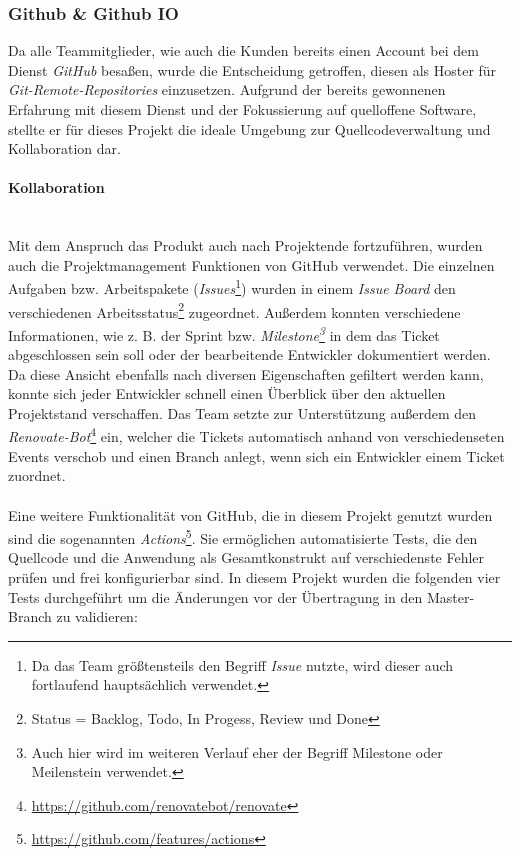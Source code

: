 \documentclass[10pt, a4paper]{article}
\begin{document}
\subsubsection{Github \& Github IO}
Da alle Teammitglieder, wie auch die Kunden bereits einen Account bei dem Dienst \textit{GitHub} besaßen, wurde die Entscheidung getroffen, diesen als Hoster für \textit{Git-Remote-Repositories} einzusetzen.
Aufgrund der bereits gewonnenen Erfahrung mit diesem Dienst und der Fokussierung auf quelloffene Software, stellte er für dieses Projekt die ideale Umgebung zur Quellcodeverwaltung und Kollaboration dar.

\paragraph{Kollaboration} $~$ \\
Mit dem Anspruch das Produkt auch nach Projektende fortzuführen, wurden auch die Projektmanagement Funktionen von GitHub verwendet. Die einzelnen Aufgaben bzw. Arbeitspakete (\textit{Issues}\footnote{Da das Team größtensteils den Begriff \textit{Issue} nutzte, wird dieser auch fortlaufend hauptsächlich verwendet.}) wurden in einem \textit{Issue Board} den verschiedenen Arbeitsstatus\footnote{Status = Backlog, Todo, In Progess, Review und Done}
zugeordnet. Außerdem konnten verschiedene Informationen, wie z. B. der Sprint bzw. \textit{Milestone\footnote{Auch hier wird im weiteren Verlauf eher der Begriff Milestone oder Meilenstein verwendet.}} in dem das Ticket abgeschlossen sein soll oder der bearbeitende Entwickler dokumentiert werden.
Da diese Ansicht ebenfalls nach diversen Eigenschaften gefiltert werden kann, konnte sich jeder Entwickler schnell einen Überblick über den aktuellen Projektstand verschaffen.
Das Team setzte zur Unterstützung außerdem den \textit{Renovate-Bot}\footnote{\raggedright\url{https://github.com/renovatebot/renovate}} ein, welcher die Tickets automatisch anhand von verschiedenseten Events verschob und einen Branch anlegt, wenn sich ein Entwickler einem Ticket zuordnet.
\\~\\
Eine weitere Funktionalität von GitHub, die in diesem Projekt genutzt wurden sind die sogenannten \textit{Actions}\footnote{\raggedright\url{https://github.com/features/actions}}.
Sie ermöglichen automatisierte Tests, die den Quellcode und die Anwendung als Gesamtkonstrukt auf verschiedenste Fehler prüfen und frei konfigurierbar sind.
In diesem Projekt wurden die folgenden vier Tests durchgeführt um die Änderungen vor der Übertragung in den Master-Branch zu validieren:
\end{document}
